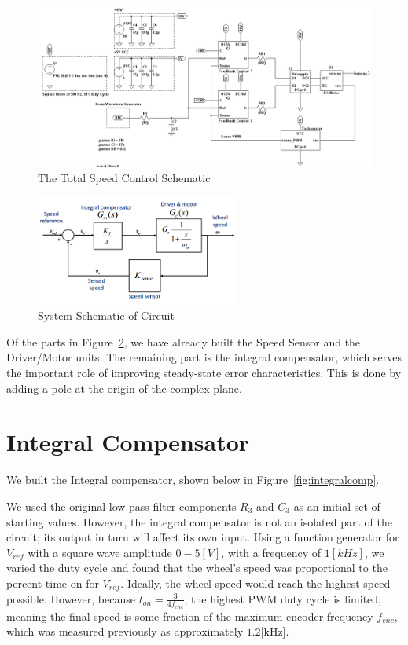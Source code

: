 \documentclass{hw}
\begin{document}
  \begin{figure}[ht!]
    \centering
    \includegraphics[width=\textwidth]{./img/overall.png}
    \caption{The Total Speed Control Schematic}
    \label{fig:overall}
  \end{figure}
  \begin{figure}[ht!]
    \centering
    \includegraphics[width=0.6\textwidth]{./img/overall2.png}
    \caption{System Schematic of Circuit}
    \label{fig:overall2}
  \end{figure}
  Of the parts in Figure~\ref{fig:overall2}, we have already built
  the Speed Sensor and the Driver/Motor units. The remaining part
  is the integral compensator, which serves the important role of
  improving steady-state error characteristics. This is done by
  adding a pole at the origin of the complex plane.
  \newpage
\section{Integral Compensator}
We built the Integral compensator, shown below in
Figure~\ref{fig:integralcomp}.

We used the original low-pass filter components $R_3$ and $C_3$ as 
an initial set of starting values. However, the integral 
compensator is not an isolated part of the circuit; its output in 
turn will affect its own input. Using a function generator for 
$V_{ref}$ with a square wave amplitude $0-5[V]$, with a frequency 
of $1[kHz]$, we varied the duty cycle and found that the
wheel's speed was proportional to the percent time on for
$V_{ref}$. Ideally, the wheel speed would reach the highest speed
possible. However, because $t_{on}=\frac{3}{4 f_{enc}}$, the
highest PWM duty cycle is limited, meaning the final speed is some
fraction of the maximum encoder frequency $f_{enc}$, which was
measured previously as approximately $1.2$[kHz].
\end{document}
